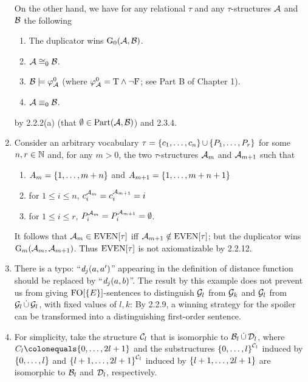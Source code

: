 \begin{enumerate}[1.]
\newpar
On the other hand, we have for any relational $\tau$ and any $\tau$-structures $\mathcal{A}$ and $\mathcal{B}$ the following
\begin{enumerate}[(1)]
\item The duplicator wins $\game{0}(\strct{A}, \strct{B})$.
\item $\mathcal{A} \cong_0 \mathcal{B}$.
\item $\mathcal{B} \models \varphi^{0}_{\mathcal{A}}$ (where $\varphi^{0}_{\mathcal{A}} = \mathrm{T} \land \neg\mathrm{F}$; see Part B of Chapter 1).
\item $\mathcal{A} \equiv_0 \mathcal{B}$.
\end{enumerate}
by 2.2.2(a) (that $\emptyset \in \mathrm{Part}(\mathcal{A}, \mathcal{B})$) and 2.3.4.
%
\item {} Consider an arbitrary vocabulary $\tau = {\{c_1, \ldots, c_n\}} \mathop{\cup} {\{P_1, \ldots, P_r\}}$ for some $n, r \in \mathbb{N}$ and, for any $m > 0$, the two $\tau$-structures $\mathcal{A}_m$ and $\mathcal{A}_{m + 1}$ such that
\begin{enumerate}[(1)]
\item $A_m = {\{1, \ldots, m + n\}}$ and $A_{m + 1} = {\{1, \ldots, m + n + 1\}}$
\item for $1 \leq i \leq n$, $c_i^{\mathcal{A}_m} = c_i^{\mathcal{A}_{m + 1}} = i$
\item for $1 \leq i \leq r$, $P_i^{\mathcal{A}_m} = P_i^{\mathcal{A}_{m + 1}} = \emptyset$.
\end{enumerate}
It follows that $\mathcal{A}_m \in \mathrm{EVEN}{[\tau]}$ iff $\mathcal{A}_{m + 1} \notin \mathrm{EVEN}{[\tau]}$; but the duplicator wins $\game{m}(\strct{A}_m, \strct{A}_{m + 1})$. Thus $\mathrm{EVEN}{[\tau]}$ is not axiomatizable by 2.2.12.
%
\item {} There is a typo: ``$\dist[j](a, a')$'' appearing in the definition of distance function should be replaced by ``$\dist[j](a, b)$''.
\newpar
The result by this example does not prevent us from giving $\folog\of{\sete{E}}$-sentences to distinguish $\mathcal{G}_l$ from $\mathcal{G}_k$ and $\mathcal{G}_l$ from $\mathcal{G}_l \mathop{\dot{\cup}} \mathcal{G}_l$, with fixed values of $l, k$: By 2.2.9, a winning strategy for the spoiler can be transformed into a distinguishing first-order sentence.
%
\item {} For simplicity, take the structure $\mathcal{C}_l$ that is isomorphic to $\mathcal{B}_l \mathop{\dot{\cup}} \mathcal{D}_l$, where $C_l \defas \sete{0, \ldots, 2l + 1}$ and the substructures ${\{0, \ldots, l\}}^{\mathcal{C}_l}$ induced by ${\{0, \ldots, l\}}$ and ${\{l + 1, \ldots, 2l + 1\}}^{\mathcal{C}_l}$ induced by ${\{l + 1, \ldots, 2l + 1\}}$ are isomorphic to $\mathcal{B}_l$ and $\mathcal{D}_l$, respectively.

\end{enumerate}
